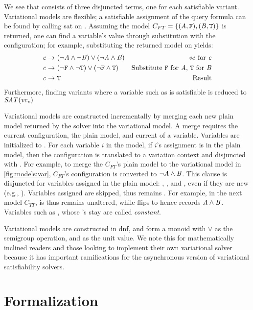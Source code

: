 We see that \Satvc{} consists of three disjuncted terms, one for each
satisfiable variant. Variational models are flexible; a satisfiable assignment
of the query formula can be found by calling \ac{sat} on \Satvc{}. Assuming the
model $C_{FT} = \{(\mathit{A}{}, \texttt{F}{}), (\mathit{B}{}, \texttt{T}{})\}$ is returned, one can find
a variable's value through substitution with the configuration; for example,
substituting the returned model on  yields:
%
\begin{align*}
  \mathit{c}{} \rightarrow\ & (\neg \mathit{A}{} \wedge \neg \mathit{B}{}) \vee (\neg \mathit{A}{} \wedge \mathit{B}{}) & \text{\ensuremath{\mathit{vc}_{}} for \ensuremath{\mathit{c}}{}} \\
  \mathit{c}{} \rightarrow\ & (\neg \texttt{F}{} \wedge \neg \texttt{T}{}) \vee (\neg \texttt{F}{} \wedge \texttt{T}{}) & \text{Substitute \texttt{F}{} for \ensuremath{\mathit{A}}{}, \texttt{T}{} for \ensuremath{\mathit{B}}{}} \\
  \mathit{c}{} \rightarrow\ & \texttt{T}{} & \text{Result}
\end{align*}%
%
Furthermore, finding variants where a variable such as \cV{} is satisfiable is
reduced to $\mathit{SAT(\mathit{vc}_{\mathit{c}{}})}$

Variational models are constructed incrementally by merging each new plain model
returned by the solver into the variational model. A merge requires the current
configuration, the plain model, and current \vc{} of a variable. Variables are
initialized to \fls{}. For each variable $i$ in the model, if $i$'s assignment
is \tru{} in the plain model, then the configuration is translated to a
variation context and disjuncted with . For example, to merge the
$C_{FT}$'s plain model to the variational model in \autoref{fig:models:var},
$C_{FT}$'s configuration is converted to $\neg \mathit{A}{} \wedge \mathit{B}{}$. This clause
is disjuncted for variables assigned \tru{} in the plain model: \vc{\aV{}},
\vc{\cV{}}, and \vc{\pV{}}, even if they are new (e.g., \cV{}). Variables
assigned \fls{} are skipped, thus \vc{\qV{}} remains \fls{}. For example, in the
next model $C_{TT}$, \cV{} is \fls{} thus \vc{\cV{}} remains unaltered, while
\vc{\qV{}} flips to \tru{} hence \vc{\qV{}} records $\mathit{A}{} \wedge \mathit{B}{}$.
Variables such as \bV{}, whose \vc{}'s stay \fls{} are called \textit{constant}.


Variational models are constructed in \ac{dnf}, and form a monoid with $\vee$ as
the semigroup operation, and \fls{} as the unit value. We note this for
mathematically inclined readers and those looking to implement their own
variational solver because it has important ramifications for the asynchronous
version of variational satisfiability solvers.
%
\section{Formalization}


